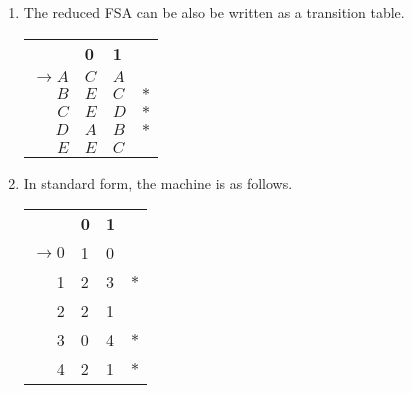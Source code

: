\documentclass[a4paper]{article}
\begin{document}
\begin{enumerate}
\begin{enumerate}
			\item The reduced FSA can be also be written as a transition table.
			\begin{center}
				\begin{tabular}{r|C{5mm}|C{5mm}|l}
					& {\bf 0} & {\bf 1} & \\ 
					$\to A$	 & $C$ & $A$ &        \\ 
					$B$	 	 & $E$ & $C$ & $\ast$ \\ 
					$C$	 	 & $E$ & $D$ & $\ast$ \\ 
					$D$	 	 & $A$ & $B$ & $\ast$ \\ 
					$E$	 	 & $E$ & $C$ &        \\ 
				\end{tabular}
			\end{center}
			
			\item In standard form, the machine is as follows.
			\begin{center}
				\begin{tabular}{r|C{5mm}|C{5mm}|l}
					& {\bf 0} & {\bf 1} & \\ 
					$\to 0$	 & 1 & 0 &        \\ 
					1	 	 & 2 & 3 & $\ast$ \\ 
					2	 	 & 2 & 1 &        \\ 
					3	 	 & 0 & 4 & $\ast$ \\ 
					4	 	 & 2 & 1 & $\ast$ \\ 
				\end{tabular}
			\end{center}
		\end{enumerate}
	\end{enumerate}
\end{document}

